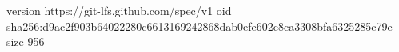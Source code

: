 version https://git-lfs.github.com/spec/v1
oid sha256:d9ac2f903b64022280c6613169242868dab0efe602c8ca3308bfa6325285c79e
size 956
